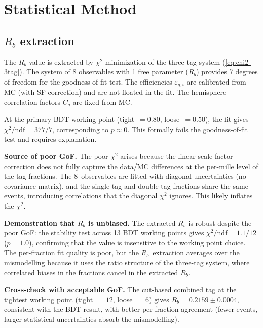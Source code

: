 \documentclass[11pt,a4paper]{article}
\begin{document}
\section{Statistical Method}
\label{sec:statmethod}

\subsection{$R_b$ extraction}

The $R_b$ value is extracted by $\chi^2$ minimization of the three-tag
system (\cref{eq:chi2-3tag}).  The system of 8 observables with 1 free
parameter ($R_b$) provides 7 degrees of freedom for the goodness-of-fit
test.  The efficiencies $\varepsilon_{q,i}$ are calibrated from MC
(with SF correction) and are not floated in the fit.  The hemisphere
correlation factors $C_q$ are fixed from MC.

At the primary BDT working point (tight~$= 0.80$, loose~$= 0.50$),
the fit gives $\chi^2/\mathrm{ndf} = 377/7$, corresponding to $p \approx 0$.
This formally fails the goodness-of-fit test and requires explanation.

\textbf{Source of poor GoF.}
The poor $\chi^2$ arises because the linear scale-factor correction
does not fully capture the data/MC differences at the per-mille level
of the tag fractions.  The 8~observables are fitted with diagonal
uncertainties (no covariance matrix), and the single-tag and double-tag
fractions share the same events, introducing correlations that the
diagonal $\chi^2$ ignores.  This likely inflates the $\chi^2$.

\textbf{Demonstration that $R_b$ is unbiased.}
The extracted $R_b$ is robust despite the poor GoF: the stability test
across 13 BDT working points gives $\chi^2/\mathrm{ndf} = 1.1/12$
($p = 1.0$), confirming that the value is insensitive to the working
point choice.  The per-fraction fit quality is poor, but the
$R_b$~extraction averages over the mismodelling because it uses the
ratio structure of the three-tag system, where correlated biases in
the fractions cancel in the extracted $R_b$.

\textbf{Cross-check with acceptable GoF.}
The cut-based combined tag at the tightest working point
(tight~$= 12$, loose~$= 6$) gives $R_b = 0.2159 \pm 0.0004$,
consistent with the BDT result, with better per-fraction agreement
(fewer events, larger statistical uncertainties absorb the mismodelling).
\end{document}
